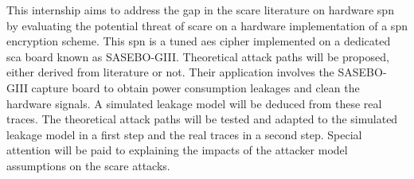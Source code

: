 \documentclass[11pt]{sdm}
\begin{document}
This internship aims to address the gap in the \gls{scare} literature on hardware \gls{spn} by evaluating the potential threat of \gls{scare} on a hardware implementation of a \gls{spn} encryption scheme.
This \gls{spn} is a tuned \gls{aes} cipher implemented on a dedicated \gls{sca} board known as SASEBO-GIII.
Theoretical attack paths will be proposed, either derived from literature or not.
Their application involves the SASEBO-GIII capture board to obtain power consumption leakages and clean the hardware signals.
A simulated leakage model will be deduced from these real traces.
The theoretical attack paths will be tested and adapted to the simulated leakage model in a first step and the real traces in a second step.
Special attention will be paid to explaining the impacts of the attacker model assumptions on the \gls{scare} attacks.




\printbibliography[title=Bibliographie]
\end{document}
